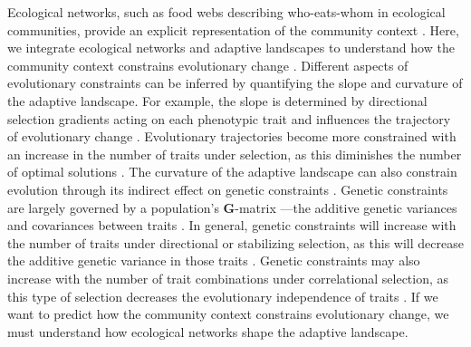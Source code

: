 \documentclass[11pt,]{article}
\begin{document}
Ecological networks, such as food webs describing who-eats-whom in
ecological communities, provide an explicit representation of the
community context \citep{Bascompte2014, McCann2012}. Here, we integrate
ecological networks and adaptive landscapes to understand how the
community context constrains evolutionary change \citep{Arnold1992}.
Different aspects of evolutionary constraints can be inferred by
quantifying the slope and curvature of the adaptive landscape. For
example, the slope is determined by directional selection gradients
acting on each phenotypic trait and influences the trajectory of
evolutionary change \citep{Lande1979, Arnold1992}. Evolutionary
trajectories become more constrained with an increase in the number of
traits under selection, as this diminishes the number of optimal
solutions \citep{Arnold2003}. The curvature of the adaptive landscape
can also constrain evolution through its indirect effect on genetic
constraints \citep{Arnold1992, Hansen2008}. Genetic constraints are
largely governed by a population's \textbf{G}-matrix ---the additive
genetic variances and covariances between traits \citep{Hansen2008}. In
general, genetic constraints will increase with the number of traits
under directional or stabilizing selection, as this will decrease the
additive genetic variance in those traits \citep{Hansen2008}. Genetic
constraints may also increase with the number of trait combinations
under correlational selection, as this type of selection decreases the
evolutionary independence of traits \citep{Hansen2008}. If we want to
predict how the community context constrains evolutionary change, we
must understand how ecological networks shape the adaptive landscape.
\end{document}
